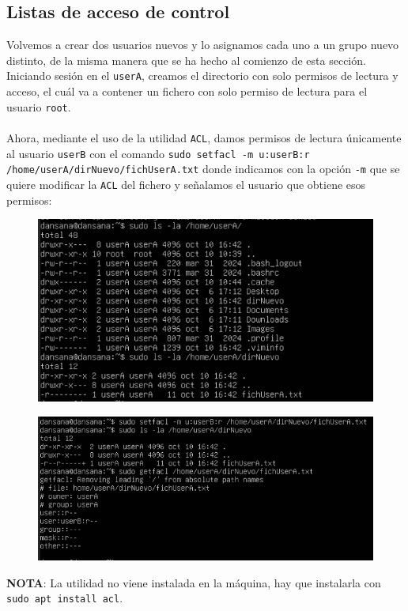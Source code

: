 \documentclass[10pt]{article}
\begin{document}
	\subsection{Listas de acceso de control}
	Volvemos a crear dos usuarios nuevos y lo asignamos cada uno a un grupo nuevo distinto, de la misma manera que se ha hecho al comienzo de esta sección. Iniciando sesión en el \verb|userA|, creamos el directorio con solo permisos de lectura y acceso, el cuál va a contener un fichero con solo permiso de lectura para el usuario \verb|root|.\\\\
	Ahora, mediante el uso de la utilidad \verb|ACL|, damos permisos de lectura únicamente al usuario \verb|userB| con el comando \verb|sudo setfacl -m u:userB:r /home/userA/dirNuevo/fichUserA.txt| donde indicamos con la opción \verb|-m| que se quiere modificar la \verb|ACL| del fichero y señalamos el usuario que obtiene esos permisos:
	\begin{figure}[H]
		\setlength{\abovecaptionskip}{0cm}
		\setlength{\belowcaptionskip}{0cm}
		\centering
		\includegraphics[width=0.7\linewidth]{Recursos/userA.png}
	\end{figure}
	\begin{figure}[H]
		\setlength{\abovecaptionskip}{0cm}
		\setlength{\belowcaptionskip}{0cm}
		\centering
		\includegraphics[width=0.7\linewidth]{Recursos/setfaclUserB.png}
	\end{figure}
	\textbf{NOTA}: La utilidad no viene instalada en la máquina, hay que instalarla con \verb|sudo apt install acl|.
	\clearpage
	
\end{document}
